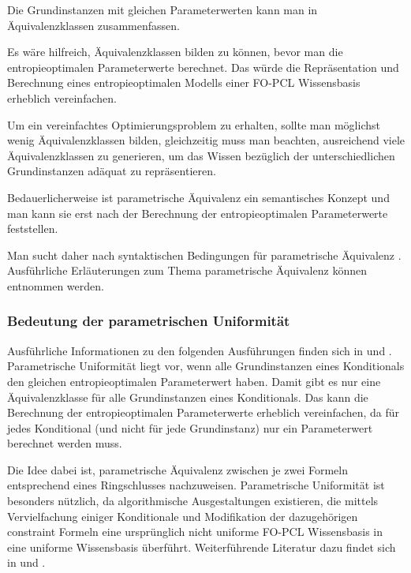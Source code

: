 \documentclass[a4paper, 11pt]{book}
\begin{document}
Die Grundinstanzen mit gleichen Parameterwerten kann man in Äquivalenzklassen zusammenfassen. 

Es wäre hilfreich, Äquivalenzklassen bilden zu können, bevor man die entropieoptimalen Parameterwerte berechnet. Das würde die Repräsentation und Berechnung eines entropieoptimalen Modells einer FO-PCL Wissensbasis
 erheblich vereinfachen.

Um ein vereinfachtes Optimierungsproblem zu erhalten, sollte man möglichst wenig Äquivalenzklassen bilden, gleichzeitig muss man beachten, ausreichend viele Äquivalenzklassen zu generieren, um das Wissen bezüglich der unterschiedlichen Grundinstanzen adäquat zu repräsentieren.

Bedauerlicherweise ist parametrische Äquivalenz  ein semantisches Konzept und man kann sie erst nach der Berechnung der entropieoptimalen Parameterwerte feststellen.

Man sucht daher nach syntaktischen Bedingungen für parametrische Äquivalenz . Ausführliche Erläuterungen zum Thema parametrische Äquivalenz können \cite[Kap. 7.1, S. 148ff]{Fis10} entnommen werden.

\subsubsection{Bedeutung der parametrischen Uniformität} 
Ausführliche Informationen zu den folgenden Ausführungen finden sich in \cite[Kap. 7.1.1 und 7.1.2, S. 151-153]{Fis10} und \cite{BHM14}.
Parametrische Uniformität liegt vor, wenn alle Grundinstanzen eines Konditionals den gleichen entropieoptimalen Parameterwert haben. Damit gibt es nur eine Äquivalenzklasse für alle Grundinstanzen eines Konditionals. Das kann die Berechnung der entropieoptimalen Parameterwerte erheblich vereinfachen, da für jedes Konditional (und nicht für jede Grundinstanz) nur ein Parameterwert berechnet werden muss. 

Die Idee dabei ist, parametrische Äquivalenz zwischen je zwei Formeln entsprechend eines Ringschlusses nachzuweisen.
Parametrische Uniformität ist besonders nützlich, da algorithmische Ausgestaltungen existieren, die mittels Vervielfachung einiger Konditionale und Modifikation der dazugehörigen constraint Formeln eine ursprünglich nicht uniforme FO-PCL Wissensbasis in eine uniforme Wissensbasis überführt. Weiterführende Literatur dazu findet sich in \cite[Kap. 5, S.71ff]{BJ11} und \cite{BK15}.
\end{document}
